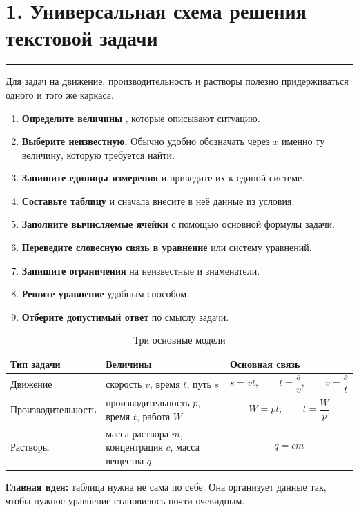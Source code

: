 \documentclass[a4paper,12pt]{article}
\newcommand{\checksection}[1]{%
  \section*{\color{darkaccent}#1}
  \vspace{-0.6em}
  {\color{accent!70}\rule{\linewidth}{0.6pt}}
  \vspace{0.35em}
}
\newcommand{\keyidea}[1]{%
  \textcolor{darkaccent}{\textbf{#1}}
}
\begin{document}
\checksection{1. Универсальная схема решения текстовой задачи}

Для задач на движение, производительность и растворы полезно придерживаться одного и того же каркаса.

\begin{enumerate}
  \item \keyidea{Определите величины}, которые описывают ситуацию.
  \item \keyidea{Выберите неизвестную.} Обычно удобно обозначать через \(x\) именно ту величину, которую требуется найти.
  \item \keyidea{Запишите единицы измерения} и приведите их к единой системе.
  \item \keyidea{Составьте таблицу} и сначала внесите в неё данные из условия.
  \item \keyidea{Заполните вычисляемые ячейки} с помощью основной формулы задачи.
  \item \keyidea{Переведите словесную связь в уравнение} или систему уравнений.
  \item \keyidea{Запишите ограничения} на неизвестные и знаменатели.
  \item \keyidea{Решите уравнение} удобным способом.
  \item \keyidea{Отберите допустимый ответ} по смыслу задачи.
\end{enumerate}

\begin{table}[ht]
\centering
\caption{Три основные модели}
\begin{tabularx}{\linewidth}{@{}p{3.1cm}p{5.1cm}X@{}}
\toprule
\textbf{Тип задачи} & \textbf{Величины} & \textbf{Основная связь} \\
\midrule
Движение
&
скорость \(v\), время \(t\), путь \(s\)
&
\[
s=vt,\qquad
t=\frac{s}{v},\qquad
v=\frac{s}{t}
\]
\\
Производительность
&
производительность \(p\), время \(t\), работа \(W\)
&
\[
W=pt,\qquad
t=\frac{W}{p}
\]
\\
Растворы
&
масса раствора \(m\), концентрация \(c\), масса вещества \(q\)
&
\[
q=cm
\]
\\
\bottomrule
\end{tabularx}
\end{table}

\keyidea{Главная идея:} таблица нужна не сама по себе. Она организует данные так, чтобы нужное уравнение становилось почти очевидным.

\end{document}
